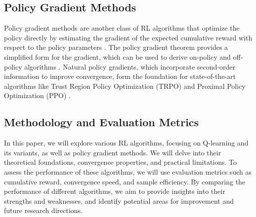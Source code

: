 \subsection{Policy Gradient Methods}

Policy gradient methods are another class of RL algorithms that optimize the policy directly by estimating the gradient of the expected cumulative reward with respect to the policy parameters \cite{1703.02102}. The policy gradient theorem provides a simplified form for the gradient, which can be used to derive on-policy and off-policy algorithms \cite{1811.09013}. Natural policy gradients, which incorporate second-order information to improve convergence, form the foundation for state-of-the-art algorithms like Trust Region Policy Optimization (TRPO) and Proximal Policy Optimization (PPO) \cite{2209.01820}.

\subsection{Methodology and Evaluation Metrics}

In this paper, we will explore various RL algorithms, focusing on Q-learning and its variants, as well as policy gradient methods. We will delve into their theoretical foundations, convergence properties, and practical limitations. To assess the performance of these algorithms, we will use evaluation metrics such as cumulative reward, convergence speed, and sample efficiency. By comparing the performance of different algorithms, we aim to provide insights into their strengths and weaknesses, and identify potential areas for improvement and future research directions.